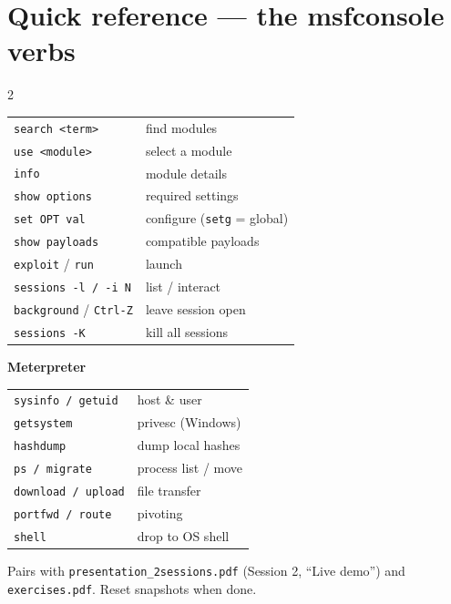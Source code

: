 \documentclass[10pt,a4paper]{article}
\begin{document}
\section*{Quick reference --- the msfconsole verbs}
\begin{multicols}{2}\small
\begin{tabular}{@{}ll@{}}
\texttt{search <term>} & find modules \\
\texttt{use <module>} & select a module \\
\texttt{info} & module details \\
\texttt{show options} & required settings \\
\texttt{set OPT val} & configure (\texttt{setg} = global) \\
\texttt{show payloads} & compatible payloads \\
\texttt{exploit} / \texttt{run} & launch \\
\texttt{sessions -l / -i N} & list / interact \\
\texttt{background} / \texttt{Ctrl-Z} & leave session open \\
\texttt{sessions -K} & kill all sessions \\
\end{tabular}

\textbf{Meterpreter}\\
\begin{tabular}{@{}ll@{}}
\texttt{sysinfo / getuid} & host \& user \\
\texttt{getsystem} & privesc (Windows) \\
\texttt{hashdump} & dump local hashes \\
\texttt{ps / migrate} & process list / move \\
\texttt{download / upload} & file transfer \\
\texttt{portfwd / route} & pivoting \\
\texttt{shell} & drop to OS shell \\
\end{tabular}
\end{multicols}

\vfill
\begin{center}\small
Pairs with \texttt{presentation\_2sessions.pdf} (Session 2, ``Live demo'') and
\texttt{exercises.pdf}. Reset snapshots when done.
\end{center}
\end{document}

